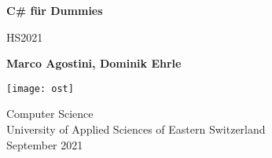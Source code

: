 \begin{titlepage}
    \begin{center}
        \vspace*{1cm}
            
        \Huge
        \textbf{C\# für Dummies}
            
        \vspace{0.5cm}
        \LARGE
        HS2021
            
        \vspace{1.5cm}
            
        \textbf{Marco Agostini, Dominik Ehrle}
            
        \vfill
            
            
        \vspace{0.8cm}
            
        \texttt{[image: ost]}
            
        \Large
        Computer Science\\
        University of Applied Sciences of Eastern Switzerland\\
        September 2021
        

    \end{center}
\end{titlepage}

\tableofcontents

\pagebreak

